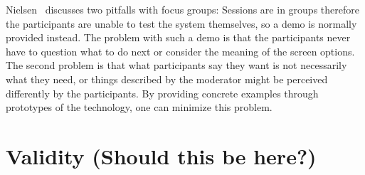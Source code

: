 Nielsen~\cite{focusGroup} discusses two pitfalls with focus groups: Sessions are in groups therefore the participants are unable to test the system themselves, so a demo is normally provided instead. The problem with such a demo is that the participants never have to question what to do next or consider the meaning of the screen options. The second problem is that what participants say they want is not necessarily what they need, or things described by the moderator might be perceived differently by the participants. By providing concrete examples through prototypes of the technology, one can minimize this problem.

\section{Validity (Should this be here?)}

